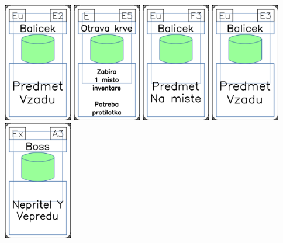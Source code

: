 \documentclass[a4paper]{article}
\begin{document}
	\includegraphics[width=3.0cm]{img-4_21}
	\includegraphics[width=3.0cm]{img-4_54}
	\includegraphics[width=3.0cm]{img-4_27}
	\includegraphics[width=3.0cm]{img-4_22}
	\includegraphics[width=3.0cm]{img-4_2}
\end{document}
